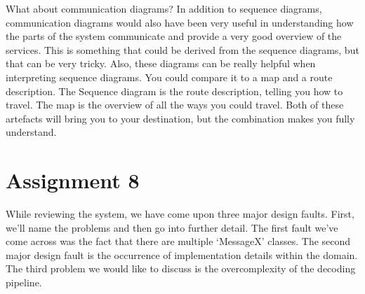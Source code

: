 \documentclass[12pt]{article}
\begin{document}
\begin{itemize}
What about communication diagrams? In addition to sequence diagrams, communication diagrams would also have been very useful in understanding how the parts of the system communicate and provide a very good overview of the services. This is something that could be derived from the sequence diagrams, but that can be very tricky. Also, these diagrams can be really helpful when interpreting sequence diagrams. You could compare it to a map and a route description. The Sequence diagram is the route description, telling you how to travel. The map is the overview of all the ways you could travel. Both of these artefacts will bring you to your destination, but the combination makes you fully understand.

\end{itemize}


\section*{Assignment 8}
While reviewing the system, we have come upon three major design faults. First, we'll name the problems and then go into further detail. The first fault we've come across was the fact that there are multiple `MessageX' classes. The second major design fault is the occurrence of implementation details within the domain. The third problem we would like to discuss is the overcomplexity of the decoding pipeline.
\end{document}
